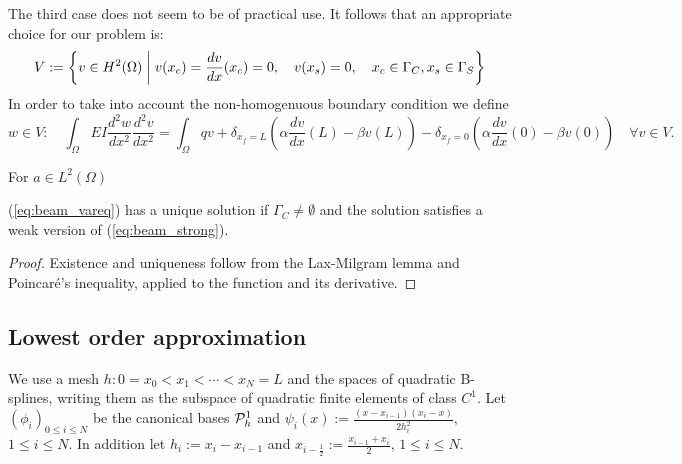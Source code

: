 %
The third case does not seem to be of practical use.
It follows that an appropriate choice for our problem is:
%
\begin{equation}\label{eq:beam_V}
V:= \left\{v\in H^2(\Omega)\;\middle|\;v(x_c)=\frac{d v}{dx}(x_c)=0, \quad v(x_s)=0,\quad x_c\in\Gamma_C,x_s\in\Gamma_S\right\}
\end{equation}
%
%
In order to take into account the non-homogenuous boundary condition we define
%
\begin{equation}\label{eq:beam_vareq2}
w\in V:\quad \int_{\Omega} EI \frac{d^2 w}{dx^2}\frac{d^2 v}{dx^2}= \int_{\Omega} qv + 
\delta_{x_f=L}(\alpha\frac{d v}{dx}(L) - \beta v(L)) - \delta_{x_f=0}(\alpha\frac{d v}{dx}(0) - \beta v(0))\quad \forall v\in V.
\end{equation}
%

%
For $a\in L^2(\Omega)$
\begin{lemma}\label{lemma:}
(\ref{eq:beam_vareq}) has a unique solution if $\Gamma_C\ne\emptyset$ and the solution satisfies a weak version of 
(\ref{eq:beam_strong}).
\end{lemma}
%
\begin{proof}
Existence and uniqueness follow from the Lax-Milgram lemma and Poincaré's inequality, applied to the function and its derivative.
\end{proof}
%
%
\subsection{Lowest order approximation}\label{subsec:}
%
We use a mesh $h:0=x_0<x_1<\cdots< x_N=L$ and the spaces of quadratic B-splines, writing them as the subspace of quadratic finite elements of class $C^1$. Let $(\phi_i)_{0\le i\le N}$ be the canonical bases $\mathcal{P}^1_h$ and $\psi_i(x):=\frac{(x-x_{i-1})(x_i-x)}{2h_i^2}$, $1\le i\le N$.
In addition let $h_i:=x_i-x_{i-1}$ and $x_{i-\frac12}:= \frac{x_{i-1}+x_{i}}{2}$, $1\le i\le N$.

